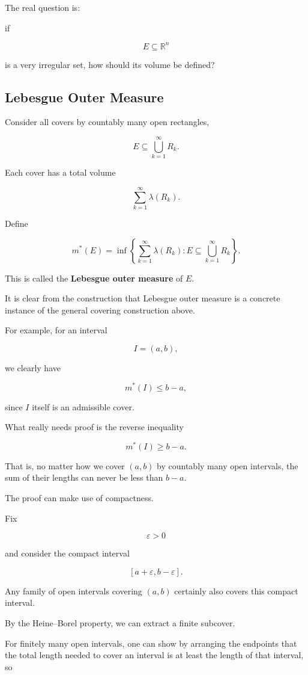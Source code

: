 \documentclass[11pt]{article}
\begin{document}
The real question is:

if

\[
E\subseteq\mathbb{R}^{n}
\]

is a very irregular set, how should its volume be defined?

\subsection{Lebesgue Outer Measure}

Consider all covers by countably many open rectangles,

\[
E\subseteq\bigcup_{k=1}^{\infty}R_{k}.
\]

Each cover has a total volume

\[
\sum_{k=1}^{\infty}\lambda(R_{k}).
\]

Define

\[
m^{*}(E)=\inf\left\{\sum_{k=1}^{\infty}\lambda(R_{k}):E\subseteq\bigcup_{k=1}^{\infty}R_{k}\right\}.
\]

This is called the \textbf{Lebesgue outer measure} of $E$.

It is clear from the construction that Lebesgue outer measure is a concrete instance of the general covering construction above.

For example, for an interval

\[
I=(a,b),
\]

we clearly have

\[
m^{*}(I)\leq b-a,
\]

since $I$ itself is an admissible cover.

What really needs proof is the reverse inequality

\[
m^{*}(I)\geq b-a.
\]

That is, no matter how we cover $(a,b)$ by countably many open intervals, the sum of their lengths can never be less than $b-a$.

The proof can make use of compactness.

Fix

\[
\varepsilon>0
\]

and consider the compact interval

\[
[a+\varepsilon,b-\varepsilon].
\]

Any family of open intervals covering $(a,b)$ certainly also covers this compact interval.

By the Heine--Borel property, we can extract a finite subcover.

For finitely many open intervals, one can show by arranging the endpoints that the total length needed to cover an interval is at least the length of that interval, so
\end{document}
